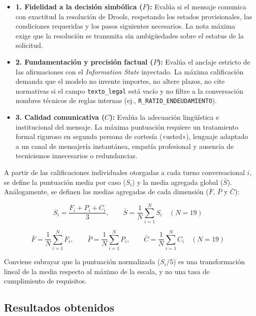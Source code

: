 \documentclass[12pt,a4paper]{report}
\begin{document}
\begin{itemize}
    \item \textbf{1. Fidelidad a la decisión simbólica ($F$):} Evalúa si el mensaje comunica con exactitud la resolución de Drools, respetando los estados provisionales, las condiciones requeridas y los pasos siguientes necesarios. La nota máxima exige que la resolución se transmita sin ambigüedades sobre el estatus de la solicitud.
    
    \item \textbf{2. Fundamentación y precisión factual ($P$):} Evalúa el anclaje estricto de las afirmaciones con el \textit{Information State} inyectado. La máxima calificación demanda que el modelo no invente importes, no altere plazos, no cite normativas si el campo \texttt{texto\_legal} está vacío y no filtre a la conversación nombres técnicos de reglas internas (ej., \texttt{R\_RATIO\_ENDEUDAMIENTO}).
    
    \item \textbf{3. Calidad comunicativa ($C$):} Evalúa la adecuación lingüística e institucional del mensaje. La máxima puntuación requiere un tratamiento formal riguroso en segunda persona de cortesía («usted»), lenguaje adaptado a un canal de mensajería instantánea, empatía profesional y ausencia de tecnicismos innecesarios o redundancias.
\end{itemize}

A partir de las calificaciones individuales otorgadas a cada turno conversacional $i$, se define la puntuación media por caso ($S_i$) y la media agregada global ($\bar{S}$). Análogamente, se definen las medias agregadas de cada dimensión ($\bar{F}$, $\bar{P}$ y $\bar{C}$):

\begin{equation}
    S_i = \frac{F_i + P_i + C_i}{3}, \qquad \bar{S} = \frac{1}{N} \sum_{i=1}^{N} S_i \quad (N = 19)
\end{equation}

\begin{equation}
    \bar{F} = \frac{1}{N} \sum_{i=1}^{N} F_i, \qquad
    \bar{P} = \frac{1}{N} \sum_{i=1}^{N} P_i, \qquad
    \bar{C} = \frac{1}{N} \sum_{i=1}^{N} C_i \quad (N = 19)
\end{equation}

Conviene subrayar que la puntuación normalizada ($S_i/5$) es una transformación lineal de la media respecto al máximo de la escala, y no una tasa de cumplimiento de requisitos.

\subsection{Resultados obtenidos}
\end{document}
